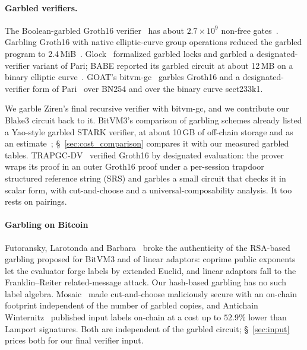 \documentclass[11pt]{article}
\begin{document}
\paragraph{Garbled verifiers.} The Boolean-garbled Groth16 verifier~\cite{bit25b}
has about $2.7\times10^9$ non-free gates~\cite{babe2026}. Garbling Groth16 with native
elliptic-curve group operations reduced the garbled program to
2.4\,MiB~\cite{kflt26native}. Glock~\cite{eag25glock} formalized garbled locks and
garbled a designated-verifier variant of Pari; BABE reported its garbled circuit at
about 12\,MB on a binary elliptic curve~\cite{babe2026}. GOAT's
bitvm-gc~\cite{bitvmgc} garbles Groth16 and a designated-verifier form of
Pari~\cite{garudapari} over BN254 and over the binary curve sect233k1.

We garble Ziren's final recursive verifier with bitvm-gc, and we contribute our
Blake3 circuit back to it. BitVM3's comparison of garbling schemes already listed a
Yao-style garbled STARK verifier, at about 10\,GB of off-chain storage and as an
estimate~\cite[Table~9]{bitvm3paper}; \S~\ref{sec:cost_comparison} compares it
with our measured garbled tables. TRAPGC-DV~\cite{trapgcdv26} verified Groth16 by designated evaluation:
the prover wraps its proof in an outer Groth16 proof under a per-session trapdoor
structured reference string (SRS) and garbles a small circuit that checks it in scalar form, with
cut-and-choose and a universal-composability analysis. It too rests on pairings.

\paragraph{Garbling on Bitcoin} Futoransky, Larotonda and
Barbara~\cite{flb25} broke the authenticity of the RSA-based garbling proposed for
BitVM3 and of linear adaptors: coprime public exponents let the evaluator forge labels by
extended Euclid, and linear adaptors fall to the Franklin--Reiter related-message
attack. Our hash-based garbling has no such label algebra. Mosaic~\cite{mosaic26}
made cut-and-choose maliciously secure with an on-chain footprint independent of
the number of garbled copies, and Antichain Winternitz~\cite{antichain26} published
input labels on-chain at a cost up to $52.9\%$ lower than Lamport signatures. Both
are independent of the garbled circuit; \S~\ref{sec:input} prices both for our
final verifier input.
\end{document}
